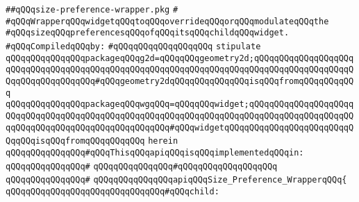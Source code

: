 \label{src/lib/x-kit/widget/old/wrapper/size-preference-wrapper.api}
\verb|##qQQqsize-preference-wrapper.pkg|\newline
\verb|#|\newline
\verb|#qQQqWrapperqQQqwidgetqQQqtoqQQqoverrideqQQqorqQQqmodulateqQQqthe|\newline
\verb|#qQQqsizeqQQqpreferencesqQQqofqQQqitsqQQqchildqQQqwidget.|\newline
\newline
\verb|#qQQqCompiledqQQqby:|\newline
\verb|#qQQqqQQqqQQqqQQqqQQq|\newline
\newline
\newline
\newline
\newline
\verb|stipulate|\newline
\verb|qQQqqQQqqQQqqQQqpackageqQQqg2d=qQQqqQQqgeometry2d;qQQqqQQqqQQqqQQqqQQqqQQqqQQqqQQqqQQqqQQqqQQqqQQqqQQqqQQqqQQqqQQqqQQqqQQqqQQqqQQqqQQqqQQqqQQqqQQqqQQqqQQqqQQq#qQQqgeometry2dqQQqqQQqqQQqqQQqisqQQqfromqQQqqQQqqQQq|\newline
\verb|qQQqqQQqqQQqqQQqpackageqQQqwgqQQq=qQQqqQQqwidget;qQQqqQQqqQQqqQQqqQQqqQQqqQQqqQQqqQQqqQQqqQQqqQQqqQQqqQQqqQQqqQQqqQQqqQQqqQQqqQQqqQQqqQQqqQQqqQQqqQQqqQQqqQQqqQQqqQQqqQQqqQQq#qQQqwidgetqQQqqQQqqQQqqQQqqQQqqQQqqQQqqQQqisqQQqfromqQQqqQQqqQQq|\newline
\verb|herein|\newline
\newline
\verb|qQQqqQQqqQQqqQQq#qQQqThisqQQqapiqQQqisqQQqimplementedqQQqin:|\newline
\verb|qQQqqQQqqQQqqQQq#|\newline
\verb|qQQqqQQqqQQqqQQq#qQQqqQQqqQQqqQQqqQQq|\newline
\verb|qQQqqQQqqQQqqQQq#|\newline
\verb|qQQqqQQqqQQqqQQqapiqQQqSize_Preference_WrapperqQQq{|\newline
\newline
\verb|qQQqqQQqqQQqqQQqqQQqqQQqqQQqqQQq#qQQqchild:|\newline
